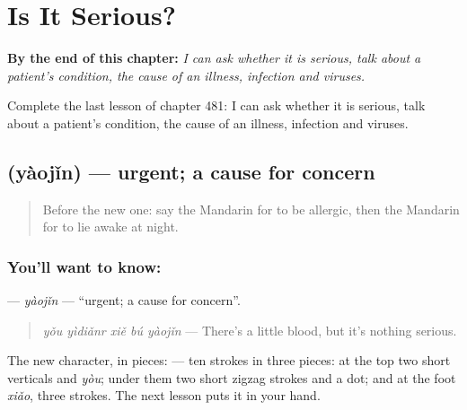 
\chapter{Is It Serious?}
\label{ch:zh-is-it-serious}

\begin{chapteropening}
\textbf{By the end of this chapter:} \emph{I can ask whether it is serious, talk about a patient's condition, the cause of an illness, infection and viruses.}

Complete the last lesson of chapter 481: I can ask whether it is serious, talk about a patient's condition, the cause of an illness, infection and viruses.
\end{chapteropening}

\section[\texorpdfstring{\zh{要紧} (yàojǐn)}{要紧 (yàojǐn)}]{ (yàojǐn) — urgent; a cause for concern}

\label{lesson:ZH-C481-yaojin}



\begin{quote}
Before the new one: say the Mandarin for to be allergic, then the Mandarin for to lie awake at night.
\end{quote}

\subsection*{You'll want to know: }
\textbf{} — \emph{yàojǐn} — \textquotedblleft{}urgent; a cause for concern\textquotedblright{}.

\begin{quote}
\textbf{} \emph{yǒu yìdiǎnr xiě bú yàojǐn} — There's a little blood, but it's nothing serious.
\end{quote}

The new character, in pieces:  — ten strokes in three pieces: at the top two short verticals and  \emph{yòu}; under them two short zigzag strokes and a dot; and at the foot  \emph{xiǎo}, three strokes. The next lesson puts it in your hand.

